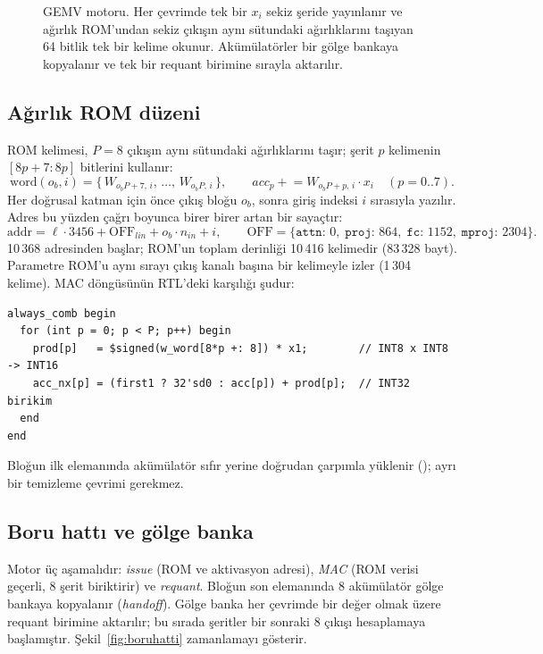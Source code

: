 \begin{figure}[h]
  \centering
  \caption[GEMV motoru]{GEMV motoru. Her çevrimde tek bir $x_i$ sekiz şeride yayınlanır ve ağırlık ROM'undan sekiz çıkışın aynı sütundaki ağırlıklarını taşıyan 64 bitlik tek bir kelime okunur. Akümülatörler bir gölge bankaya kopyalanır ve tek bir requant birimine sırayla aktarılır.}
  \label{fig:gemv}
\end{figure}

\subsection{Ağırlık ROM düzeni}
ROM kelimesi, $P=8$ çıkışın aynı sütundaki ağırlıklarını taşır; şerit $p$ kelimenin $[8p{+}7 : 8p]$ bitlerini kullanır:
\begin{equation}
  \mathrm{word}(o_b, i) = \{\, W_{o_b P + 7,\, i},\, \dots,\, W_{o_b P,\, i} \,\}, \qquad acc_p \mathrel{+}= W_{o_b P + p,\, i} \cdot x_i \quad (p = 0..7).
\end{equation}
Her doğrusal katman için önce çıkış bloğu $o_b$, sonra giriş indeksi $i$ sırasıyla yazılır. Adres bu yüzden çağrı boyunca birer birer artan bir sayaçtır:
\begin{equation}
  \mathrm{addr} = \ell\cdot3456 + \mathrm{OFF}_{lin} + o_b \cdot n_{in} + i, \qquad
  \mathrm{OFF} = \{\texttt{attn}{:}\,0,\; \texttt{proj}{:}\,864,\; \texttt{fc}{:}\,1152,\; \texttt{mproj}{:}\,2304\}.
\end{equation}
 10\,368 adresinden başlar; ROM'un toplam derinliği 10\,416 kelimedir (83\,328 bayt). Parametre ROM'u aynı sırayı çıkış kanalı başına bir kelimeyle izler (1\,304 kelime). MAC döngüsünün RTL'deki karşılığı şudur:

\begin{lstlisting}[language=SV]
always_comb begin
  for (int p = 0; p < P; p++) begin
    prod[p]   = $signed(w_word[8*p +: 8]) * x1;        // INT8 x INT8 -> INT16
    acc_nx[p] = (first1 ? 32'sd0 : acc[p]) + prod[p];  // INT32 birikim
  end
end
\end{lstlisting}

Bloğun ilk elemanında akümülatör sıfır yerine doğrudan çarpımla yüklenir (); ayrı bir temizleme çevrimi gerekmez.

\subsection{Boru hattı ve gölge banka}
Motor üç aşamalıdır: \emph{issue} (ROM ve aktivasyon adresi), \emph{MAC} (ROM verisi geçerli, 8 şerit biriktirir) ve \emph{requant}. Bloğun son elemanında 8 akümülatör gölge bankaya kopyalanır (\emph{handoff}). Gölge banka her çevrimde bir değer olmak üzere requant birimine aktarılır; bu sırada şeritler bir sonraki 8 çıkışı hesaplamaya başlamıştır. Şekil~\ref{fig:boruhatti} zamanlamayı gösterir.


